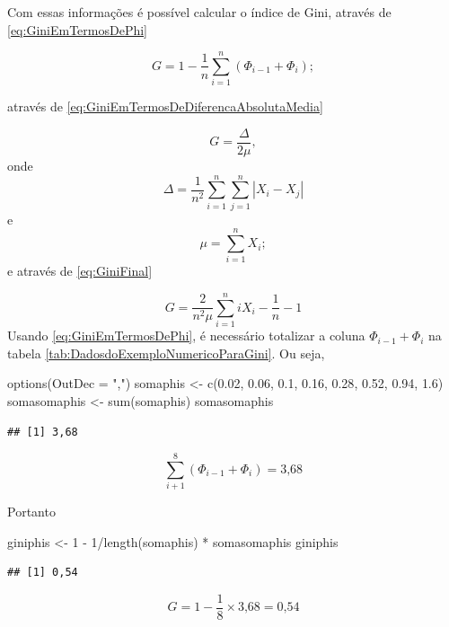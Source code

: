 \documentclass[
]{book}
\newenvironment{Shaded}{\begin{snugshade}}{\end{snugshade}}
\newcommand{\AttributeTok}[1]{\textcolor[rgb]{0.77,0.63,0.00}{#1}}
\newcommand{\DecValTok}[1]{\textcolor[rgb]{0.00,0.00,0.81}{#1}}
\newcommand{\FloatTok}[1]{\textcolor[rgb]{0.00,0.00,0.81}{#1}}
\newcommand{\FunctionTok}[1]{\textcolor[rgb]{0.00,0.00,0.00}{#1}}
\newcommand{\NormalTok}[1]{#1}
\newcommand{\OtherTok}[1]{\textcolor[rgb]{0.56,0.35,0.01}{#1}}
\newcommand{\SpecialCharTok}[1]{\textcolor[rgb]{0.00,0.00,0.00}{#1}}
\newcommand{\StringTok}[1]{\textcolor[rgb]{0.31,0.60,0.02}{#1}}
\begin{document}
Com essas informações é possível calcular o índice de Gini, através de \eqref{eq:GiniEmTermosDePhi}

\[
G = 1 - \dfrac{1}{n}\sum_{i=1}^{n}(\Phi_{i-1} + \Phi_i);
\]

através de \eqref{eq:GiniEmTermosDeDiferencaAbsolutaMedia}

\[
G = \dfrac{\Delta}{2\mu},
\]
onde
\[
\Delta = \dfrac{1}{n^2}\sum_{i=1}^{n}\sum_{j=1}^{n}|X_i - X_j|
\]
e
\[
\mu = \sum_{i=1}^{n}X_i;
\]
e através de \eqref{eq:GiniFinal}

\[
G = \dfrac{2}{n^2\mu}\sum_{i=1}^{n} iX_i - \dfrac{1}{n} - 1
\]
Usando \eqref{eq:GiniEmTermosDePhi}, é necessário totalizar a coluna \(\Phi_{i-1} + \Phi_i\) na tabela \ref{tab:DadosdoExemploNumericoParaGini}. Ou seja,

\begin{Shaded}
\begin{Highlighting}[]
\FunctionTok{options}\NormalTok{(}\AttributeTok{OutDec =} \StringTok{","}\NormalTok{)}
\NormalTok{somaphis }\OtherTok{\textless{}{-}} \FunctionTok{c}\NormalTok{(}\FloatTok{0.02}\NormalTok{, }\FloatTok{0.06}\NormalTok{, }\FloatTok{0.1}\NormalTok{, }\FloatTok{0.16}\NormalTok{, }\FloatTok{0.28}\NormalTok{, }\FloatTok{0.52}\NormalTok{, }\FloatTok{0.94}\NormalTok{, }
    \FloatTok{1.6}\NormalTok{)}
\NormalTok{somasomaphis }\OtherTok{\textless{}{-}} \FunctionTok{sum}\NormalTok{(somaphis)}
\NormalTok{somasomaphis}
\end{Highlighting}
\end{Shaded}

\begin{verbatim}
## [1] 3,68
\end{verbatim}

\[
\sum_{i+1}^{8} (\Phi_{i-1} + \Phi_i) = \text{3,68}
\]

Portanto

\begin{Shaded}
\begin{Highlighting}[]
\NormalTok{giniphis }\OtherTok{\textless{}{-}} \DecValTok{1} \SpecialCharTok{{-}} \DecValTok{1}\SpecialCharTok{/}\FunctionTok{length}\NormalTok{(somaphis) }\SpecialCharTok{*}\NormalTok{ somasomaphis}
\NormalTok{giniphis}
\end{Highlighting}
\end{Shaded}

\begin{verbatim}
## [1] 0,54
\end{verbatim}

\[
G = 1 - \dfrac{1}{8}\times \text{3,68} = \text{0,54}
\]
\end{document}
